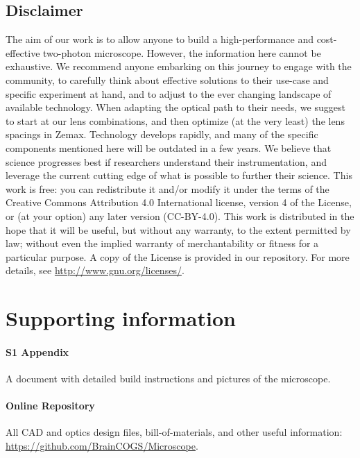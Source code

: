 \documentclass[10pt,letterpaper]{article}
\begin{document}
\subsection*{Disclaimer}
The aim of our work is to allow anyone to build a high-performance and cost-effective two-photon microscope. However, the information here cannot be exhaustive. We recommend anyone embarking on this journey to engage with the community, to carefully think about effective solutions to their use-case and specific experiment at hand, and to adjust to the ever changing landscape of available technology. When adapting the optical path to their needs, we suggest to start at our lens combinations, and then optimize (at the very least) the lens spacings in Zemax. Technology develops rapidly, and many of the specific components mentioned here will be outdated in a few years. We believe that science progresses best if researchers understand their instrumentation, and leverage the current cutting edge of what is possible to further their science.\newline
This work is free: you can redistribute it and/or modify it under the terms of the Creative Commons Attribution 4.0 International license, version 4 of the License, or (at your option) any later version (CC-BY-4.0). This work is distributed in the hope that it will be useful, but without any warranty, to the extent permitted by law; without even the implied warranty of merchantability or fitness for a particular purpose. A copy of the License is provided in our repository.  For more details, see \url{http://www.gnu.org/licenses/}.

\section*{Supporting information}

\paragraph*{S1 Appendix}
\label{S1_Appendix}
A document with detailed build instructions and pictures of the microscope.

\paragraph*{\bf Online Repository}
\label{repository}
All CAD and optics design files, bill-of-materials, and other useful information: \url{https://github.com/BrainCOGS/Microscope}.
\end{document}
